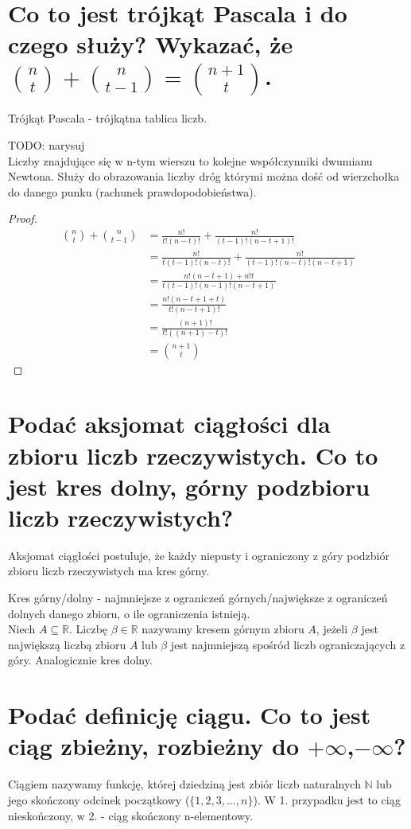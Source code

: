\documentclass{article}
\numberwithin{equation}{section}
\theoremstyle{definition}
\theoremstyle{case}
\begin{document}
\section{Co to jest trójkąt Pascala i do czego służy? Wykazać, że
	\texorpdfstring
	{${\binom{n}{t}+\binom{n}{t-1}=\binom{n+1}{t}}$.}
		{(n t)+(n t-1)=(n+1 t).}
	}
Trójkąt Pascala - trójkątna tablica liczb.
\begin{multicols}{2}
	TODO: narysuj
	\\
	Liczby znajdujące się w n-tym wierszu to kolejne współczynniki dwumianu Newtona. Służy do obrazowania liczby dróg którymi można dość od wierzchołka do danego punku (rachunek prawdopodobieństwa).
\end{multicols}
\begin{proof}
	\begin{align*}
		\binom{n}{t}+\binom{n}{t-1}
		&= \frac{n!}{t!(n-t)!}+\frac{n!}{(t-1)!(n-t+1)!}
		\\ &= \frac{n!}{t(t-1)!(n-t)!}+\frac{n!}{(t-1)!(n-t)!(n-t+1)}
		\\ &= \frac{n!(n-t+1)+n!t}{t(t-1)!(n-1)!(n-t+1)}
		\\ &= \frac{n!(n-t+1+t)}{t!(n-t+1)!}
		\\ &= \frac{(n+1)!}{t!((n+1)-t)!}
		\\ &= \binom{n+1}{t}
	\end{align*}
\end{proof}

\section{Podać aksjomat ciągłości dla zbioru liczb rzeczywistych. Co to jest kres dolny, górny podzbioru liczb rzeczywistych?}
Aksjomat ciągłości postuluje, że każdy niepusty i ograniczony z góry podzbiór zbioru liczb rzeczywistych ma kres górny.

Kres górny/dolny - najmniejsze z ograniczeń górnych/największe z ograniczeń dolnych danego zbioru, o ile ograniczenia istnieją.
\\Niech $A \subseteq \mathbb{R}$. Liczbę $\beta \in \mathbb{R}$ nazywamy kresem górnym zbioru $A$, jeżeli $\beta$ jest największą liczbą zbioru $A$ lub $\beta$ jest najmniejszą spośród liczb ograniczających z góry. Analogicznie kres dolny.

\section{Podać definicję ciągu. Co to jest ciąg zbieżny, rozbieżny do \texorpdfstring{$+\infty$,$-\infty$}{+inf,-inf}?}
Ciągiem nazywamy funkcję, której dziedziną jest zbiór liczb naturalnych $\mathbb{N}$ lub jego skończony odcinek początkowy ($\{1,2,3,\dots,n\}$). W 1. przypadku jest to ciąg nieskończony, w 2. - ciąg skończony n-elementowy.
\end{document}

